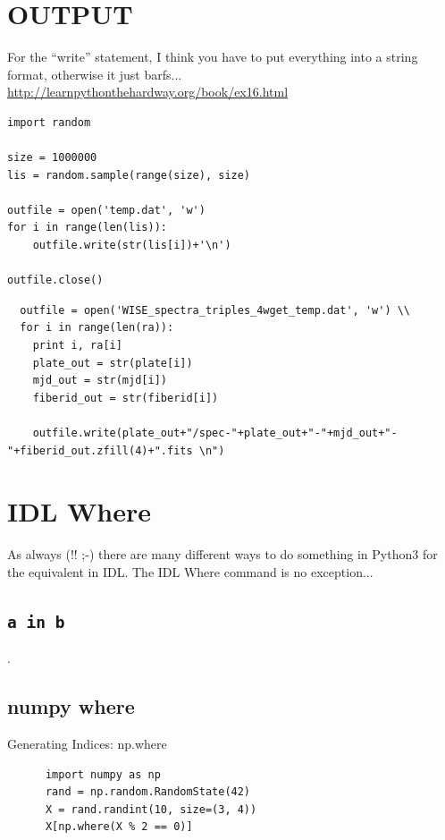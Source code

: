 \documentclass[11pt,a4paper]{article}
\begin{document}
\newpage
\section{OUTPUT}
For the ``write'' statement, I think you have to put everything into 
a string format, otherwise it just barfs... \\
\href{http://learnpythonthehardway.org/book/ex16.html}{http://learnpythonthehardway.org/book/ex16.html}

\noindent
\begin{lstlisting}
import random

size = 1000000
lis = random.sample(range(size), size)

outfile = open('temp.dat', 'w')
for i in range(len(lis)):
    outfile.write(str(lis[i])+'\n')
    
outfile.close()
\end{lstlisting}

\begin{lstlisting}
  outfile = open('WISE_spectra_triples_4wget_temp.dat', 'w') \\
  for i in range(len(ra)): 
    print i, ra[i] 
    plate_out = str(plate[i])
    mjd_out = str(mjd[i]) 
    fiberid_out = str(fiberid[i])

    outfile.write(plate_out+"/spec-"+plate_out+"-"+mjd_out+"-"+fiberid_out.zfill(4)+".fits \n")
\end{lstlisting}





\newpage
\section{IDL Where}
As always (!! ;-) there are many different ways to do something in
Python3 for the equivalent in IDL. The IDL Where command is no
exception...

    \subsection{{\tt a in b}}.


    \subsection{numpy where}
      Generating Indices: np.where
    \begin{lstlisting}
      import numpy as np
      rand = np.random.RandomState(42)
      X = rand.randint(10, size=(3, 4))
      X[np.where(X % 2 == 0)]
    \end{lstlisting}
\end{document}
